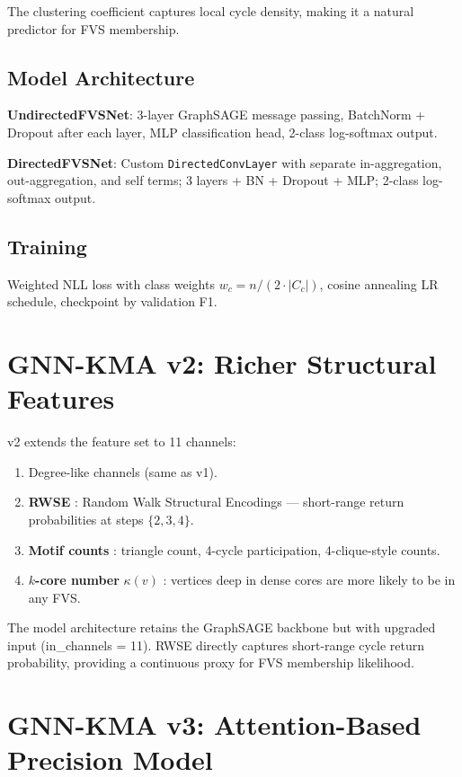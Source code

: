 \documentclass[10pt,a4paper]{report}
\theoremstyle{definition}
\begin{document}
The clustering coefficient \cite{watts1998} captures local cycle density, making it a natural predictor for FVS membership.

\subsection{Model Architecture}

\textbf{UndirectedFVSNet}: 3-layer GraphSAGE \cite{hamilton2017} message passing, BatchNorm + Dropout after each layer, MLP classification head, 2-class log-softmax output.

\textbf{DirectedFVSNet}: Custom \texttt{DirectedConvLayer} with separate in-aggregation, out-aggregation, and self terms; 3 layers + BN + Dropout + MLP; 2-class log-softmax output.

\subsection{Training}

Weighted NLL loss with class weights $w_c = n / (2 \cdot |C_c|)$, cosine annealing LR schedule, checkpoint by validation F1.

\section{GNN-KMA v2: Richer Structural Features}

v2 extends the feature set to 11 channels:

\begin{enumerate}
	\item Degree-like channels (same as v1).
	\item \textbf{RWSE} \cite{dwivedi2023}: Random Walk Structural Encodings --- short-range return probabilities at steps $\{2, 3, 4\}$.
	\item \textbf{Motif counts} \cite{ahmed2015}: triangle count, 4-cycle participation, 4-clique-style counts.
	\item \textbf{$k$-core number} $\kappa(v)$ \cite{batagelj2003}: vertices deep in dense cores are more likely to be in any FVS.
\end{enumerate}

The model architecture retains the GraphSAGE backbone but with upgraded input (in\_channels = 11). RWSE directly captures short-range cycle return probability, providing a continuous proxy for FVS membership likelihood.

\section{GNN-KMA v3: Attention-Based Precision Model}
\end{document}
